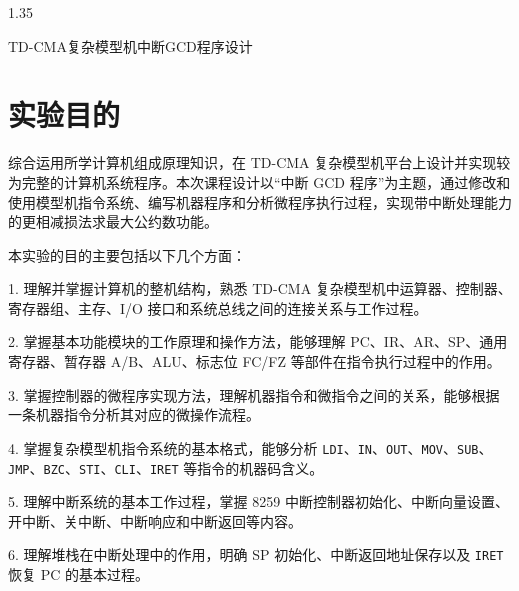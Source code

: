 \documentclass[UTF8,12pt,a4paper]{ctexart}
\newcommand{\inst}[1]{\texttt{#1}}
\begin{document}
\songti


\clearpage

\setcounter{page}{1}
\thispagestyle{fancy}

\begin{spacing}{1.35}
\tableofcontents
\end{spacing}

\clearpage

\setcounter{page}{1}
\songti

\begin{center}
{\heiti TD-CMA复杂模型机中断GCD程序设计}
\end{center}

\vspace{0.8cm}

\section{实验目的}

综合运用所学计算机组成原理知识，在 TD-CMA 复杂模型机平台上设计并实现较为完整的计算机系统程序。本次课程设计以“中断 GCD 程序”为主题，通过修改和使用模型机指令系统、编写机器程序和分析微程序执行过程，实现带中断处理能力的更相减损法求最大公约数功能。

本实验的目的主要包括以下几个方面：

1. 理解并掌握计算机的整机结构，熟悉 TD-CMA 复杂模型机中运算器、控制器、寄存器组、主存、I/O 接口和系统总线之间的连接关系与工作过程。

2. 掌握基本功能模块的工作原理和操作方法，能够理解 PC、IR、AR、SP、通用寄存器、暂存器 A/B、ALU、标志位 FC/FZ 等部件在指令执行过程中的作用。

3. 掌握控制器的微程序实现方法，理解机器指令和微指令之间的关系，能够根据一条机器指令分析其对应的微操作流程。

4. 掌握复杂模型机指令系统的基本格式，能够分析 \inst{LDI}、\inst{IN}、\inst{OUT}、\inst{MOV}、\inst{SUB}、\inst{JMP}、\inst{BZC}、\inst{STI}、\inst{CLI}、\inst{IRET} 等指令的机器码含义。

5. 理解中断系统的基本工作过程，掌握 8259 中断控制器初始化、中断向量设置、开中断、关中断、中断响应和中断返回等内容。

6. 理解堆栈在中断处理中的作用，明确 SP 初始化、中断返回地址保存以及 \inst{IRET} 恢复 PC 的基本过程。
\end{document}
